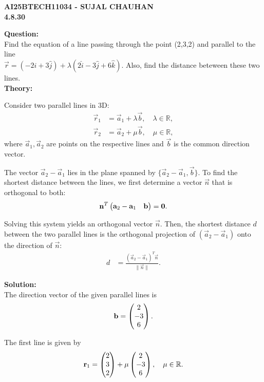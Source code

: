 \documentclass[12pt]{article}
\begin{document}
\newpage
\begin{center}
\textbf{\Large AI25BTECH11034 - SUJAL CHAUHAN }\\
\textbf{4.8.30}
\end{center}

\textbf{Question:}\\
Find the equation of a line passing through the point (2,3,2) and parallel to the line \\
$\Vec{r}= (-2\hat{i}+3\hat{j})+\lambda(2\hat{i}-3\hat{j}+6\hat{k})$. Also, find the distance beteween these two lines.\\[2cm]

\textbf{Theory:}  

Consider two parallel lines in 3D:
\begin{align}
    \vec{r}_1 &= \vec{a}_1 + \lambda \vec{b}, \quad \lambda \in \mathbb{R}, \\[6pt]
    \vec{r}_2 &= \vec{a}_2 + \mu \vec{b}, \quad \mu \in \mathbb{R},
\end{align}
where $\vec{a}_1, \vec{a}_2$ are points on the respective lines and $\vec{b}$ is the common direction vector.  

The vector $\vec{a}_2 - \vec{a}_1$ lies in the plane spanned by $\{\vec{a}_2 - \vec{a}_1, \vec{b}\}$.  
To find the shortest distance between the lines, we first determine a vector $\vec{n}$ that is orthogonal to both:
\begin{align}
    \mathbf{n}^T \begin{pmatrix} \mathbf{a}_2 - \mathbf{a}_1 & \mathbf{b} \end{pmatrix} = \mathbf{0}.
\end{align}

Solving this system yields an orthogonal vector $\vec{n}$.  
Then, the shortest distance $d$ between the two parallel lines is the orthogonal projection of $(\vec{a}_2 - \vec{a}_1)$ onto the direction of $\vec{n}$:
\begin{align}
    d &= \frac{(\vec{a}_2 - \vec{a}_1)^T \vec{n} }{\|\vec{n}\|}.
\end{align}


\textbf{Solution:}\\[2cm]
The direction vector of the given parallel lines is
\begin{align}
    \mathbf{b} = \begin{pmatrix}2 \\ -3 \\ 6\end{pmatrix}.
\end{align}

The first line is given by
\begin{align}
    \mathbf{r}_1 = \begin{pmatrix}2 \\ 3 \\ 2\end{pmatrix} + \mu \begin{pmatrix}2 \\ -3 \\ 6\end{pmatrix}, \quad \mu \in \mathbb{R}.
\end{align}
\end{document}
